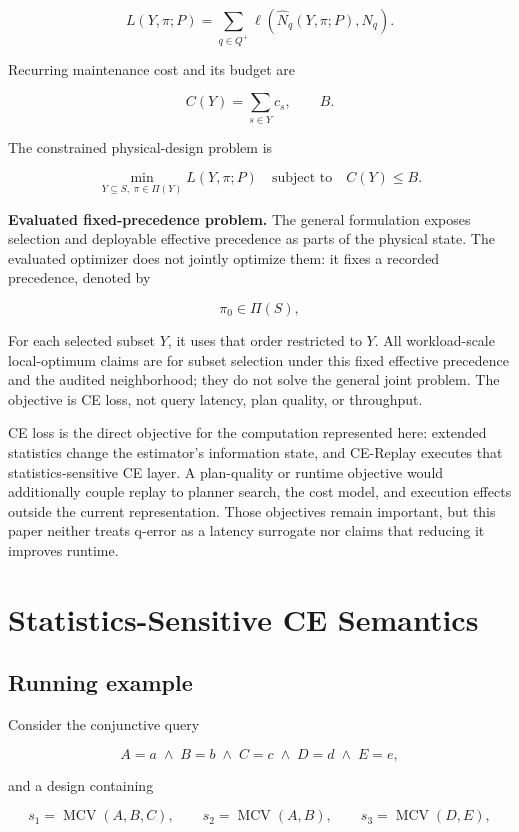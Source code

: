 \documentclass[sigconf,nonacm]{acmart}
\begin{document}
\[
L(Y,\pi;P)
=
\sum_{q\in Q^+}
\ell\!\left(\widehat{N}_q(Y,\pi;P),N_q\right).
\]

Recurring maintenance cost and its budget are

\[
C(Y)=\sum_{s\in Y}c_s, \qquad B.
\]

The constrained physical-design problem is

\[
\min_{Y\subseteq S,\;\pi\in\Pi(Y)} L(Y,\pi;P)
\quad \text{subject to} \quad
C(Y) \le B.
\]

\textbf{Evaluated fixed-precedence problem.} The general formulation exposes selection and deployable effective precedence as parts of the physical state. The evaluated optimizer does not jointly optimize them: it fixes a recorded precedence, denoted by

\[
\pi_0 \in \Pi(S),
\]

For each selected subset $Y$, it uses that order restricted to $Y$. All workload-scale local-optimum claims are for subset selection under this fixed effective precedence and the audited neighborhood; they do not solve the general joint problem. The objective is CE loss, not query latency, plan quality, or throughput.

CE loss is the direct objective for the computation represented here: extended statistics change the estimator's information state, and CE-Replay executes that statistics-sensitive CE layer. A plan-quality or runtime objective would additionally couple replay to planner search, the cost model, and execution effects outside the current representation. Those objectives remain important, but this paper neither treats q-error as a latency surrogate nor claims that reducing it improves runtime.

\section{Statistics-Sensitive CE Semantics}\label{sec:4}

\subsection{Running example}

Consider the conjunctive query

\[
A=a \;\land\; B=b \;\land\; C=c \;\land\; D=d \;\land\; E=e,
\]

and a design containing

\[
s_1=\operatorname{MCV}(A,B,C),\qquad
s_2=\operatorname{MCV}(A,B),\qquad
s_3=\operatorname{MCV}(D,E),
\]
\end{document}
